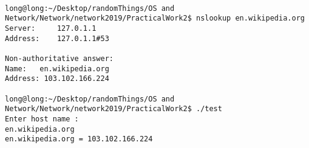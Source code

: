 \documentclass[12pt]{article}
\begin{document}
\maketitle
\begin{lstlisting}

long@long:~/Desktop/randomThings/OS and Network/Network/network2019/PracticalWork2$ nslookup en.wikipedia.org
Server:		127.0.1.1
Address:	127.0.1.1#53

Non-authoritative answer:
Name:	en.wikipedia.org
Address: 103.102.166.224

long@long:~/Desktop/randomThings/OS and Network/Network/network2019/PracticalWork2$ ./test 
Enter host name : 
en.wikipedia.org
en.wikipedia.org = 103.102.166.224



\end{lstlisting}
\end{document}
